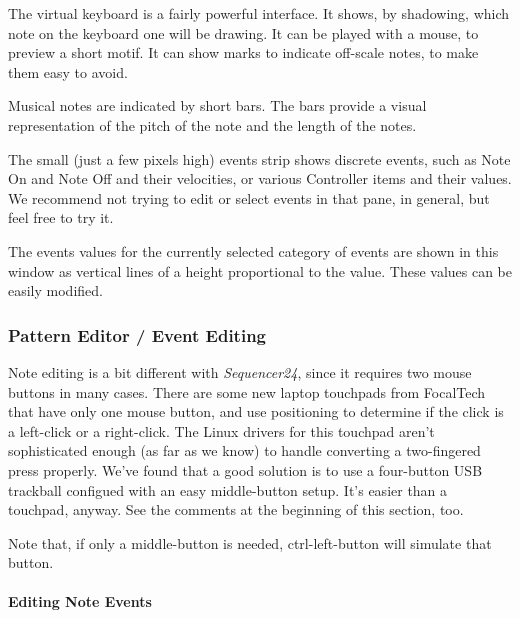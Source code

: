    The virtual keyboard is a fairly powerful interface.  It shows,
   by shadowing, which note on the keyboard one will be drawing. It can be
   played with a mouse, to preview a short motif.
   It can show marks to indicate off-scale notes, to make them easy to
   avoid.

   Musical notes are indicated by short bars.  The bars provide a visual
   representation of the pitch of the note and the length of the notes.

   The small (just a few pixels high) events strip shows discrete events,
   such as Note On and Note Off and their velocities, or various Controller
   items and their values.  We recommend not trying to edit or select events
   in that pane, in general, but feel free to try it.

   The events values for the currently selected category of events are shown
   in this window as vertical lines of a height proportional to the value.
   These values can be easily modified.

\subsubsection{Pattern Editor / Event Editing}
\label{subsubsec:seq24_pattern_editor_event_editing}

   Note editing is a bit different with \textsl{Sequencer24}, since it
   requires two mouse buttons in many cases.  There are some new
   laptop touchpads from FocalTech that have only one mouse button, and
   use positioning to determine if the click is a left-click or a right-click.
   The Linux drivers for this touchpad aren't sophisticated enough (as far
   as we know) to handle converting a two-fingered press properly.
   We've found that a good solution is to use a four-button USB trackball
   configued with an easy middle-button setup.
   It's easier than a touchpad, anyway.
   See the comments at the beginning of this section, too.

   Note that, if only a middle-button is needed, ctrl-left-button will
   simulate that button.

\paragraph{Editing Note Events}
\label{paragraph:seq24_pattern_editor_note_events}

